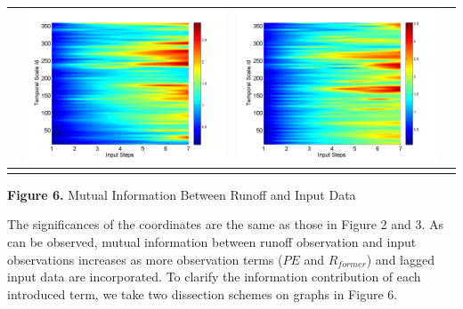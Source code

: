 \documentclass[review]{elsarticle}
\begin{document}
\begin{table}[H]
\begin{tabular}{cccc}
&\begin{minipage}{.3\textwidth}\includegraphics[width=\linewidth]{resultgraph/06810000pep.png}\end{minipage}
&\begin{minipage}{.3\textwidth}\includegraphics[width=\linewidth]{resultgraph/06810000pepq.png}\end{minipage}
\\
\hline
\\
\end{tabular}
\Large{\textbf{Figure 6.} Mutual Information Between Runoff and Input Data }
\end{table}
The significances of the coordinates are the same as those in Figure 2
and 3. As can be observed, mutual information between runoff observation and input observations increases as more observation terms ($PE$ and $R_{former}$) and lagged input data are incorporated. To clarify the information contribution of each introduced term, 
we take two dissection schemes on graphs in Figure 6.
\end{document}
